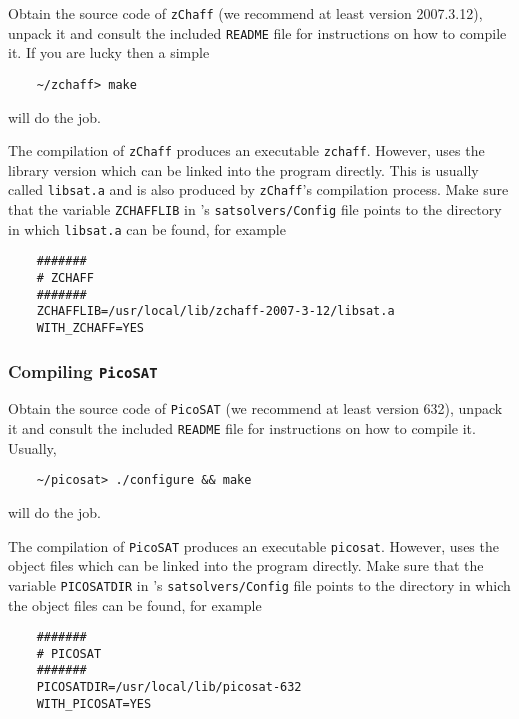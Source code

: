 Obtain the source code of \texttt{zChaff} (we recommend at least version 2007.3.12), unpack it and
consult the included \texttt{README} file for instructions on how to compile it. If you are lucky
then a simple
\begin{verbatim}
    ~/zchaff> make
\end{verbatim}
will do the job.


The compilation of \texttt{zChaff} produces an executable \texttt{zchaff}. However, \pgsolver uses the
library version which can be linked into the program directly. This is usually called \texttt{libsat.a}
and is also produced by \texttt{zChaff}'s compilation process. Make sure that the variable
\verb#ZCHAFFLIB# in \pgsolver's \texttt{satsolvers/Config} file points to the directory in which \texttt{libsat.a}
can be found, for example
\begin{verbatim}
    #######
    # ZCHAFF
    #######
    ZCHAFFLIB=/usr/local/lib/zchaff-2007-3-12/libsat.a
    WITH_ZCHAFF=YES
\end{verbatim}


\subsubsection{Compiling \texttt{PicoSAT}}

Obtain the source code of \texttt{PicoSAT} (we recommend at least version 632), unpack it and
consult the included \texttt{README} file for instructions on how to compile it. Usually,
\begin{verbatim}
    ~/picosat> ./configure && make
\end{verbatim}
will do the job.

The compilation of \texttt{PicoSAT} produces an executable \texttt{picosat}. However, \pgsolver uses the
object files which can be linked into the program directly. Make sure that the variable
\verb#PICOSATDIR# in \pgsolver's \texttt{satsolvers/Config} file points to the directory in which the object files
can be found, for example
\begin{verbatim}
    #######
    # PICOSAT
    #######
    PICOSATDIR=/usr/local/lib/picosat-632
    WITH_PICOSAT=YES
\end{verbatim}


